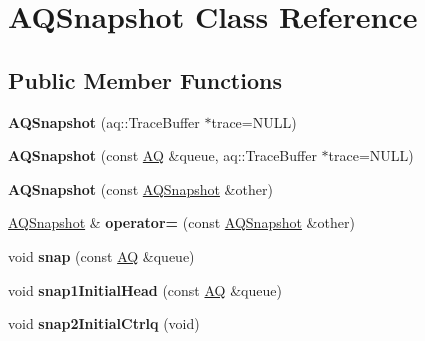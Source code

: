 \hypertarget{class_a_q_snapshot}{}\section{A\+Q\+Snapshot Class Reference}
\label{class_a_q_snapshot}
\subsection*{Public Member Functions}
\begin{DoxyCompactItemize}
\item 
{\bfseries A\+Q\+Snapshot} (aq\+::\+Trace\+Buffer $\ast$trace=N\+U\+LL)\hypertarget{class_a_q_snapshot_a95d65f0f166eaaeaf321dc66df231366}{}\label{class_a_q_snapshot_a95d65f0f166eaaeaf321dc66df231366}

\item 
{\bfseries A\+Q\+Snapshot} (const \hyperlink{class_a_q}{AQ} \&queue, aq\+::\+Trace\+Buffer $\ast$trace=N\+U\+LL)\hypertarget{class_a_q_snapshot_acd641f8ba5493df284cc09b546ffe687}{}\label{class_a_q_snapshot_acd641f8ba5493df284cc09b546ffe687}

\item 
{\bfseries A\+Q\+Snapshot} (const \hyperlink{class_a_q_snapshot}{A\+Q\+Snapshot} \&other)\hypertarget{class_a_q_snapshot_aeee8da6b40d706aadcdfc191502d8e7e}{}\label{class_a_q_snapshot_aeee8da6b40d706aadcdfc191502d8e7e}

\item 
\hyperlink{class_a_q_snapshot}{A\+Q\+Snapshot} \& {\bfseries operator=} (const \hyperlink{class_a_q_snapshot}{A\+Q\+Snapshot} \&other)\hypertarget{class_a_q_snapshot_a901ac5ebb680f56f4d3a305e15db7b4f}{}\label{class_a_q_snapshot_a901ac5ebb680f56f4d3a305e15db7b4f}

\item 
void {\bfseries snap} (const \hyperlink{class_a_q}{AQ} \&queue)\hypertarget{class_a_q_snapshot_a60d0ddba6b37297f349db12f1f8fdd21}{}\label{class_a_q_snapshot_a60d0ddba6b37297f349db12f1f8fdd21}

\item 
void {\bfseries snap1\+Initial\+Head} (const \hyperlink{class_a_q}{AQ} \&queue)\hypertarget{class_a_q_snapshot_ac96df72098fc41dfb0750e4f9bdf8da3}{}\label{class_a_q_snapshot_ac96df72098fc41dfb0750e4f9bdf8da3}

\item 
void {\bfseries snap2\+Initial\+Ctrlq} (void)\hypertarget{class_a_q_snapshot_a7f435e4d7d57bf75c027274c5a735a26}{}\label{class_a_q_snapshot_a7f435e4d7d57bf75c027274c5a735a26}


\end{DoxyCompactItemize}
